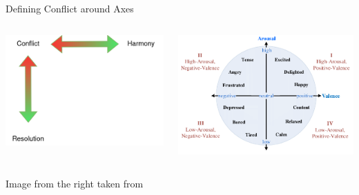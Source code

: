 \documentclass[aspectratio=169]{beamer}
\begin{document}
\begin{frame}{Defining Conflict around Axes}
    \begin{columns}
        \begin{column}{.5\linewidth}
            \includegraphics[width=\linewidth]{intro-to-ch/images/ConflictDetection.drawio.png}
        \end{column}
        \begin{column}{.5\linewidth}
            \includegraphics[width=\linewidth]{intro-to-ch/images/Two-dimensional-valence-arousal-space.png}
        \end{column}
    \end{columns}
    \vspace{1em}
    {\footnotesize Image from the right taken from }
\end{frame}
\end{document}
